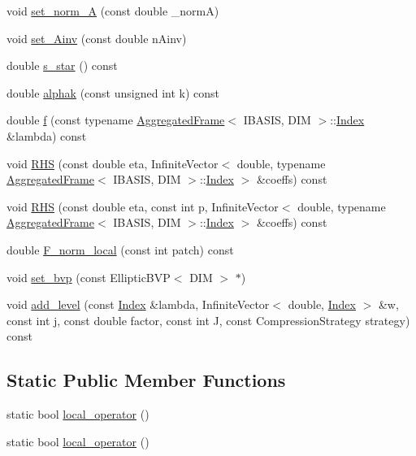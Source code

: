 \begin{CompactItemize}
void \hyperlink{classFrameTL_1_1SimpleEllipticEquation_2c56b637a942bd4543e7cbf6cd885244}{set\_\-norm\_\-A} (const double \_\-normA)
\item 
void \hyperlink{classFrameTL_1_1SimpleEllipticEquation_dace879d1d00d7e327a108c68451c714}{set\_\-Ainv} (const double nAinv)
\item 
double \hyperlink{classFrameTL_1_1SimpleEllipticEquation_26ed425b0ab5dc516bd626730d08c4af}{s\_\-star} () const 
\item 
double \hyperlink{classFrameTL_1_1SimpleEllipticEquation_aa99066841e723261103f2e7354eff92}{alphak} (const unsigned int k) const 
\item 
double \hyperlink{classFrameTL_1_1SimpleEllipticEquation_20fd2926333555fbd8c4ecf6d062c2e5}{f} (const typename \hyperlink{classFrameTL_1_1AggregatedFrame}{AggregatedFrame}$<$ IBASIS, DIM $>$::\hyperlink{classFrameTL_1_1FrameIndex}{Index} \&lambda) const 
\item 
void \hyperlink{classFrameTL_1_1SimpleEllipticEquation_2062b30008f73db23fa8b7415016ca00}{RHS} (const double eta, InfiniteVector$<$ double, typename \hyperlink{classFrameTL_1_1AggregatedFrame}{AggregatedFrame}$<$ IBASIS, DIM $>$::\hyperlink{classFrameTL_1_1FrameIndex}{Index} $>$ \&coeffs) const 
\item 
void \hyperlink{classFrameTL_1_1SimpleEllipticEquation_df01a8cf6b82866368e5c584a1fbbfa5}{RHS} (const double eta, const int p, InfiniteVector$<$ double, typename \hyperlink{classFrameTL_1_1AggregatedFrame}{AggregatedFrame}$<$ IBASIS, DIM $>$::\hyperlink{classFrameTL_1_1FrameIndex}{Index} $>$ \&coeffs) const 
\item 
double \hyperlink{classFrameTL_1_1SimpleEllipticEquation_dc2e6668d1d7f143d1ce1a88e18eddc8}{F\_\-norm\_\-local} (const int patch) const 
\item 
void \hyperlink{classFrameTL_1_1SimpleEllipticEquation_56298192b4c795a3e2923d3c9175116e}{set\_\-bvp} (const EllipticBVP$<$ DIM $>$ $\ast$)
\item 
void \hyperlink{classFrameTL_1_1SimpleEllipticEquation_c21526eb37390ef77b7130e20c6ae000}{add\_\-level} (const \hyperlink{classFrameTL_1_1FrameIndex}{Index} \&lambda, InfiniteVector$<$ double, \hyperlink{classFrameTL_1_1FrameIndex}{Index} $>$ \&w, const int j, const double factor, const int J, const CompressionStrategy strategy) const 
\end{CompactItemize}
\subsection*{Static Public Member Functions}
\begin{CompactItemize}
\item 
static bool \hyperlink{classFrameTL_1_1SimpleEllipticEquation_cd41f35521f8ac7af05fd0294cbf76ef}{local\_\-operator} ()
\item 
static bool \hyperlink{classFrameTL_1_1SimpleEllipticEquation_cd41f35521f8ac7af05fd0294cbf76ef}{local\_\-operator} ()
\end{CompactItemize}
